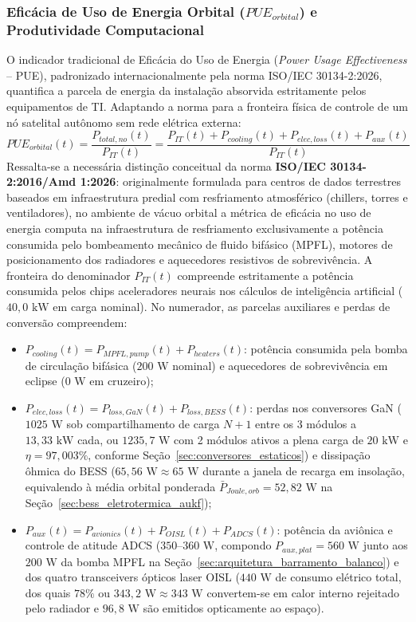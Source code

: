 \subsubsection{Eficácia de Uso de Energia Orbital \texorpdfstring{($PUE_{orbital}$)}{(PUE-orbital)} e Produtividade Computacional}

O indicador tradicional de Eficácia do Uso de Energia (\textit{Power Usage Effectiveness} -- PUE), padronizado internacionalmente pela norma ISO/IEC 30134-2:2026, quantifica a parcela de energia da instalação absorvida estritamente pelos equipamentos de TI. Adaptando a norma para a fronteira física de controle de um nó satelital autônomo sem rede elétrica externa:
\begin{equation}
    PUE_{orbital}(t) = \frac{P_{total,no}(t)}{P_{IT}(t)} = \frac{P_{IT}(t) + P_{cooling}(t) + P_{elec,loss}(t) + P_{aux}(t)}{P_{IT}(t)}
    \label{eq:pue_orbital_rigoroso}
\end{equation}
Ressalta-se a necessária distinção conceitual da norma \textbf{ISO/IEC 30134-2:2016/Amd 1:2026}: originalmente formulada para centros de dados terrestres baseados em infraestrutura predial com resfriamento atmosférico (chillers, torres e ventiladores), no ambiente de vácuo orbital a métrica de eficácia no uso de energia computa na infraestrutura de resfriamento exclusivamente a potência consumida pelo bombeamento mecânico de fluido bifásico (MPFL), motores de posicionamento dos radiadores e aquecedores resistivos de sobrevivência. A fronteira do denominador $P_{IT}(t)$ compreende estritamente a potência consumida pelos chips aceleradores neurais nos cálculos de inteligência artificial ($40{,}0\text{ kW}$ em carga nominal). No numerador, as parcelas auxiliares e perdas de conversão compreendem:
\begin{itemize}[leftmargin=*]
    \item $P_{cooling}(t) = P_{MPFL,pump}(t) + P_{heaters}(t)$: potência consumida pela bomba de circulação bifásica ($200\text{ W}$ nominal) e aquecedores de sobrevivência em eclipse ($0\text{ W}$ em cruzeiro);
    \item $P_{elec,loss}(t) = P_{loss,GaN}(t) + P_{loss,BESS}(t)$: perdas nos conversores GaN ($1025\text{ W}$ sob compartilhamento de carga $N+1$ entre os 3 módulos a $13{,}33\text{ kW}$ cada, ou $1235{,}7\text{ W}$ com 2 módulos ativos a plena carga de $20\text{ kW}$ e $\eta = 97{,}003\%$, conforme Seção~\ref{sec:conversores_estaticos}) e dissipação ôhmica do BESS ($65{,}56\text{ W} \approx 65\text{ W}$ durante a janela de recarga em insolação, equivalendo à média orbital ponderada $\bar{P}_{Joule,orb} = 52{,}82\text{ W}$ na Seção~\ref{sec:bess_eletrotermica_aukf});
    \item $P_{aux}(t) = P_{avionics}(t) + P_{OISL}(t) + P_{ADCS}(t)$: potência da aviônica e controle de atitude ADCS ($350\text{--}360\text{ W}$, compondo $P_{aux,plat} = 560\text{ W}$ junto aos $200\text{ W}$ da bomba MPFL na Seção~\ref{sec:arquitetura_barramento_balanco}) e dos quatro transceivers ópticos laser OISL ($440\text{ W}$ de consumo elétrico total, dos quais $78\%$ ou $343{,}2\text{ W} \approx 343\text{ W}$ convertem-se em calor interno rejeitado pelo radiador e $96{,}8\text{ W}$ são emitidos opticamente ao espaço).
\end{itemize}

